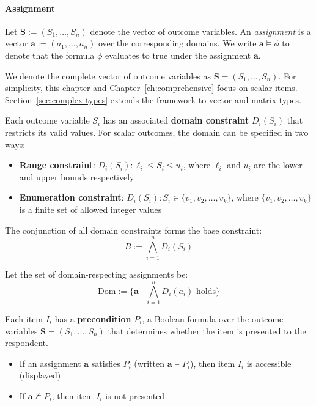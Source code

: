 \paragraph{Assignment}

Let $\mathbf{S} := (S_1, \dots, S_n)$ denote the vector of outcome variables. An \emph{assignment} is a vector $\mathbf{a} := (a_1, \dots, a_n)$ over the corresponding domains. We write $\mathbf{a} \models \phi$ to denote that the formula $\phi$ evaluates to true under the assignment $\mathbf{a}$.

We denote the complete vector of outcome variables as $\mathbf{S} = (S_1, \dots, S_n)$. For simplicity, this chapter and Chapter~\ref{ch:comprehensive} focus on scalar items. Section~\ref{sec:complex-types} extends the framework to vector and matrix types.

\begin{definition}
\label{def:domain-constraint}
Each outcome variable $S_i$ has an associated \textbf{domain constraint} $D_i(S_i)$ that restricts its valid values. For scalar outcomes, the domain can be specified in two ways:
\begin{itemize}
    \item \textbf{Range constraint}: $D_i(S_i) : \ell_i \leq S_i \leq u_i$, where $\ell_i$ and $u_i$ are the lower and upper bounds respectively
    \item \textbf{Enumeration constraint}: $D_i(S_i) : S_i \in \{v_1, v_2, \ldots, v_k\}$, where $\{v_1, v_2, \ldots, v_k\}$ is a finite set of allowed integer values
\end{itemize}
\end{definition}

The conjunction of all domain constraints forms the base constraint:
\[
B := \bigwedge_{i=1}^n D_i(S_i)
\]

Let the set of domain-respecting assignments be:
\[
  \mathrm{Dom} := \bigl\{\mathbf{a} \mid \bigwedge_{i=1}^{n} D_i(a_i) \text{ holds} \bigr\}
\]

\begin{definition}[Precondition]
\label{def:precondition}
Each item $I_i$ has a \textbf{precondition} $P_i$, a Boolean formula over the outcome variables $\mathbf{S} = (S_1, \dots, S_n)$ that determines whether the item is presented to the respondent.
\begin{itemize}
    \item If an assignment $\mathbf{a}$ satisfies $P_i$ (written $\mathbf{a} \models P_i$), then item $I_i$ is accessible (displayed)
    \item If $\mathbf{a} \not\models P_i$, then item $I_i$ is not presented
\end{itemize}
\end{definition}

